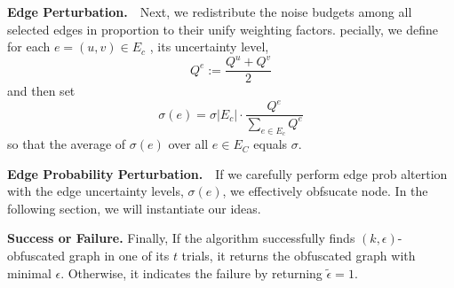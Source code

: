 \textbf{Edge Perturbation.}~~Next, we redistribute the noise budgets among all selected edges in proportion to their unify weighting factors. pecially, we define for each $e=(u,v) \in E_{c}$ , its uncertainty level, 
\begin{equation*}
    Q^{e}:= \frac{Q^{u}+Q^{v}}{2}
\end{equation*}
and then set  
\begin{equation*}
    \sigma(e)=\sigma |E_{c}|  \cdot \frac{Q^{e}}{\sum_{e \in E_{c}} Q^{e}}
\end{equation*}
so that the average of $\sigma(e)$ over all $e \in E_{C}$ equals $\sigma$.

\textbf{Edge Probability Perturbation.}~~If we carefully perform edge prob altertion with the edge uncertainty levels, $\sigma(e)$, we effectively obfsucate node. In the following section, we will instantiate our ideas.

\textbf{Success or Failure.} Finally, If the algorithm successfully finds $(k,\epsilon)$-obfuscated graph in one of its $t$ trials, it returns the obfuscated graph with minimal $\epsilon$. Otherwise, it indicates the failure by returning $\tilde{\epsilon}=1$. 
